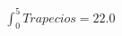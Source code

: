 \documentclass[preview]{standalone}
\begin{document}
\begin{align*}
\int_0^5 Trapecios =  22.0
\end{align*}
\end{document}

